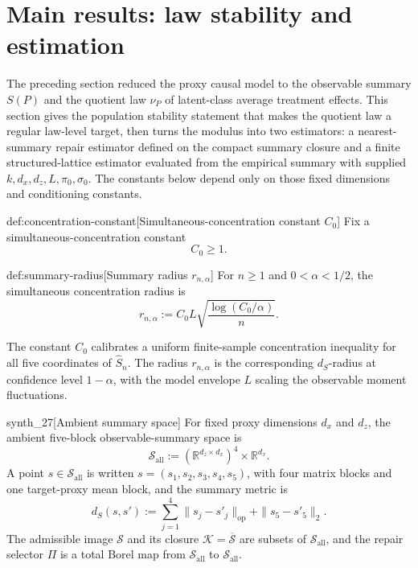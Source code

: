 \section{Main results: law stability and estimation}

The preceding section reduced the proxy causal model to the observable summary \(S(P)\) and the quotient law \(\nu_P\) of latent-class average treatment effects. This section gives the population stability statement that makes the quotient law a regular law-level target, then turns the modulus into two estimators: a nearest-summary repair estimator defined on the compact summary closure and a finite structured-lattice estimator evaluated from the empirical summary with supplied \(k,d_x,d_z,L,\pi_0,\sigma_0\). The constants below depend only on those fixed dimensions and conditioning constants.

\begin{definitionv}{def:concentration-constant}[Simultaneous-concentration constant \(C_0\)]
Fix a simultaneous-concentration constant
\[
C_0\ge 1.
\]
\end{definitionv}

\begin{definitionv}{def:summary-radius}[Summary radius \(r_{n,\alpha}\)]
For \(n\ge 1\) and \(0<\alpha<1/2\), the simultaneous concentration radius is
\[
r_{n,\alpha}
:=
C_0L\sqrt{\frac{\log(C_0/\alpha)}{n}}.
\]
\end{definitionv}

The constant \(C_0\) calibrates a uniform finite-sample concentration inequality for all five coordinates of \(\widehat S_n\). The radius \(r_{n,\alpha}\) is the corresponding \(d_S\)-radius at confidence level \(1-\alpha\), with the model envelope \(L\) scaling the observable moment fluctuations.

\begin{definitionv}{synth_27}[Ambient summary space]
For fixed proxy dimensions \(d_x\) and \(d_z\), the ambient five-block observable-summary space is
\[
\mathscr S_{\mathrm{all}}
:=
(\mathbb R^{d_z\times d_x})^4\times\mathbb R^{d_x}.
\]
A point \(s\in\mathscr S_{\mathrm{all}}\) is written \(s=(s_1,s_2,s_3,s_4,s_5)\), with four matrix blocks and one target-proxy mean block, and the summary metric is
\[
d_S(s,s'):=\sum_{j=1}^{4}\|s_j-s'_j\|_{\mathrm{op}}+\|s_5-s'_5\|_2 .
\]
The admissible image \(\mathscr S\) and its closure \(\mathcal K=\overline{\mathscr S}\) are subsets of \(\mathscr S_{\mathrm{all}}\), and the repair selector \(\Pi\) is a total Borel map from \(\mathscr S_{\mathrm{all}}\) to \(\mathscr S_{\mathrm{all}}\).
\end{definitionv}

